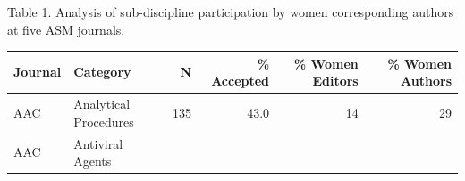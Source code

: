 \documentclass[11pt,]{article}
\begin{document}
\newpage

Table 1. Analysis of sub-discipline participation by women corresponding
authors at five ASM journals.

\begin{longtable}[]{@{}llrrrr@{}}
\toprule
\begin{minipage}[b]{0.06\columnwidth}\raggedright\strut
Journal\strut
\end{minipage} & \begin{minipage}[b]{0.43\columnwidth}\raggedright\strut
Category\strut
\end{minipage} & \begin{minipage}[b]{0.04\columnwidth}\raggedleft\strut
N\strut
\end{minipage} & \begin{minipage}[b]{0.08\columnwidth}\raggedleft\strut
\% Accepted\strut
\end{minipage} & \begin{minipage}[b]{0.11\columnwidth}\raggedleft\strut
\% Women Editors\strut
\end{minipage} & \begin{minipage}[b]{0.11\columnwidth}\raggedleft\strut
\% Women Authors\strut
\end{minipage}\tabularnewline
\midrule
\endhead
\begin{minipage}[t]{0.06\columnwidth}\raggedright\strut
AAC\strut
\end{minipage} & \begin{minipage}[t]{0.43\columnwidth}\raggedright\strut
Analytical Procedures\strut
\end{minipage} & \begin{minipage}[t]{0.04\columnwidth}\raggedleft\strut
135\strut
\end{minipage} & \begin{minipage}[t]{0.08\columnwidth}\raggedleft\strut
43.0\strut
\end{minipage} & \begin{minipage}[t]{0.11\columnwidth}\raggedleft\strut
14\strut
\end{minipage} & \begin{minipage}[t]{0.11\columnwidth}\raggedleft\strut
29\strut
\end{minipage}\tabularnewline
\begin{minipage}[t]{0.06\columnwidth}\raggedright\strut
AAC\strut
\end{minipage} & \begin{minipage}[t]{0.43\columnwidth}\raggedright\strut
Antiviral Agents\strut

\end{minipage}
\end{longtable}
\end{document}

